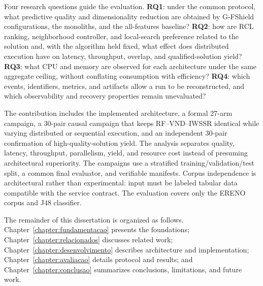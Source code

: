 Four research questions guide the evaluation. \textbf{RQ1}: under the common protocol, what predictive quality and dimensionality reduction are obtained by G-FShield configurations, the monoliths, and the all-features baseline? \textbf{RQ2}: how are RCL ranking, neighborhood controller, and local-search preference related to the solution and, with the algorithm held fixed, what effect does distributed execution have on latency, throughput, overlap, and qualified-solution yield? \textbf{RQ3}: what CPU and memory are observed for each architecture under the same aggregate ceiling, without conflating consumption with efficiency? \textbf{RQ4}: which events, identifiers, metrics, and artifacts allow a run to be reconstructed, and which observability and recovery properties remain unevaluated?

The contribution includes the implemented architecture, a formal 27-arm campaign, a 30-pair causal campaign that keeps RF--VND--IWSSR identical while varying distributed or sequential execution, and an independent 30-pair confirmation of high-quality-solution yield. The analysis separates quality, latency, throughput, parallelism, yield, and resource cost instead of presuming architectural superiority. The campaigns use a stratified training/validation/test split, a common final evaluator, and verifiable manifests. Corpus independence is architectural rather than experimental: input must be labeled tabular data compatible with the service contract. The evaluation covers only the ERENO corpus and J48 classifier.

The remainder of this dissertation is organized as follows. Chapter~\ref{chapter:fundamentacao} presents the foundations; Chapter~\ref{chapter:relacionados} discusses related work; Chapter~\ref{chapter:desenvolvimento} describes architecture and implementation; Chapter~\ref{chapter:avaliacao} details protocol and results; and Chapter~\ref{chapter:conclusao} summarizes conclusions, limitations, and future work.
